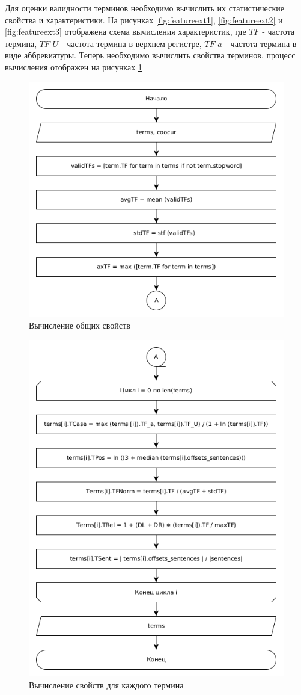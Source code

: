 Для оценки валидности терминов необходимо вычислить их статистические свойства и характеристики.
На рисунках \ref{fig:featureext1}, \ref{fig:featureext2} и \ref{fig:featureext3} отображена схема вычисления характеристик, где $TF$ - частота термина, $TF\_U$ - частота термина в верхнем регистре, $TF\_a$ - частота термина в виде аббревиатуры.
Теперь необходимо вычислить свойства терминов, процесс вычисления отображен на рисунках \ref{fig:calculate1}
\begin{figure}[!h]
	\centering
	\includegraphics[width=0.7\linewidth]{src/img/design/calculate_1}
	\caption{Вычисление общих свойств}
	\label{fig:calculate1}
\end{figure}

\begin{figure}[!h]
	\centering
	\includegraphics[width=0.7\linewidth]{src/img/design/calculate_2}
	\caption{Вычисление свойств для каждого термина}
	\label{fig:calculate2}
\end{figure}

